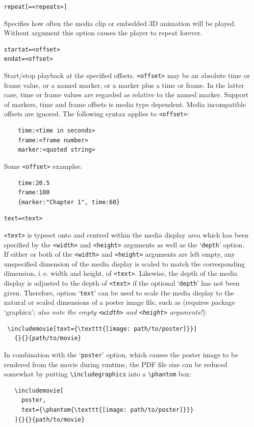 \documentclass[a4paper]{article}
\begin{document}
\begin{verbatim}
repeat[=<repeats>]
\end{verbatim}
Specifies how often the media clip or embedded 3D animation will be played. Without argument this option causes the player to repeat forever.
\begin{verbatim}
startat=<offset>
endat=<offset>
\end{verbatim}
Start/stop playback at the specified offsets. \verb+<offset>+ may be an absolute time or frame value, or a named marker, or a marker plus a time or frame. In the latter case, time or frame values are regarded as relative to the named marker. Support of markers, time and frame offsets is media type dependent. Media incompatible offsets are ignored. The following syntax applies to \verb+<offset>+:
\begin{verbatim}
    time:<time in seconds>
    frame:<frame number>
    marker:<quoted string>
\end{verbatim}
Some \verb+<offset>+ examples:
\begin{verbatim}
    time:20.5
    frame:100
    {marker:"Chapter 1", time:60}
\end{verbatim}
\hypertarget{lnk:textoption}{}
\begin{verbatim}
text=<text>
\end{verbatim}
\verb+<text>+ is typeset onto and centred within the media display area which has been specified by the \verb+<width>+ and \verb+<height>+ arguments as well as the `\verb+depth+' option. If either or both of the \verb+<width>+ and \verb+<height>+ arguments are left empty, any unspecified dimension of the media display is scaled to match the corresponding dimension, i.\,e. width and height, of \verb+<text>+. Likewise, the depth of the media display is adjusted to the depth of \verb+<text>+ if the optional `\verb+depth+' has not been given. Therefore, option `\verb+text+' can be used to scale the media display to the natural or scaled dimensions of a poster image file, such as (requires package `graphicx'; \emph{also note the empty {\tt<width>} and  {\tt<height>} arguments!}):
\begin{verbatim}
 \includemovie[text={\texttt{[image: path/to/poster]}}]
   {}{}{path/to/movie}
\end{verbatim}
In combination with the `\verb+poster+' option, which causes the poster image to be rendered from the movie during runtime, the PDF file size can be reduced somewhat by putting \verb+\includegraphics+ into a \verb+\phantom+ box:
\begin{verbatim}
   \includemovie[
     poster,
     text={\phantom{\texttt{[image: path/to/poster]}}}
   ]{}{}{path/to/movie}
\end{verbatim}
\end{document}
